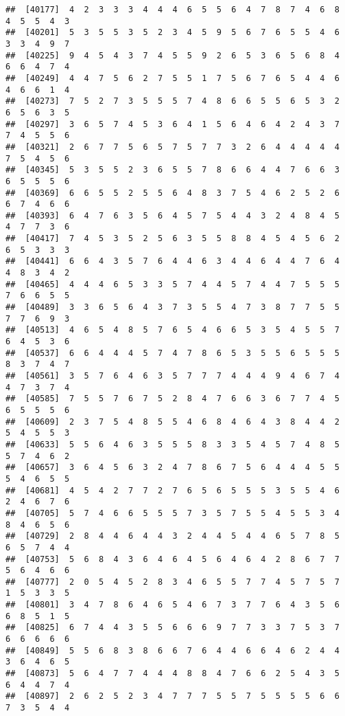 \documentclass[
]{book}
\begin{document}
\begin{verbatim}
##  [40177]  4  2  3  3  3  4  4  4  6  5  5  6  4  7  8  7  4  6  8  4  5  5  4  3
##  [40201]  5  3  5  5  3  5  2  3  4  5  9  5  6  7  6  5  5  4  6  3  3  4  9  7
##  [40225]  9  4  5  4  3  7  4  5  5  9  2  6  5  3  6  5  6  8  4  6  6  4  7  4
##  [40249]  4  4  7  5  6  2  7  5  5  1  7  5  6  7  6  5  4  4  6  4  6  6  1  4
##  [40273]  7  5  2  7  3  5  5  5  7  4  8  6  6  5  5  6  5  3  2  6  5  6  3  5
##  [40297]  3  6  5  7  4  5  3  6  4  1  5  6  4  6  4  2  4  3  7  7  4  5  5  6
##  [40321]  2  6  7  7  5  6  5  7  5  7  7  3  2  6  4  4  4  4  4  7  5  4  5  6
##  [40345]  5  3  5  5  2  3  6  5  5  7  8  6  6  4  4  7  6  6  3  6  5  5  5  6
##  [40369]  6  6  5  5  2  5  5  6  4  8  3  7  5  4  6  2  5  2  6  6  7  4  6  6
##  [40393]  6  4  7  6  3  5  6  4  5  7  5  4  4  3  2  4  8  4  5  4  7  7  3  6
##  [40417]  7  4  5  3  5  2  5  6  3  5  5  8  8  4  5  4  5  6  2  6  5  3  3  3
##  [40441]  6  6  4  3  5  7  6  4  4  6  3  4  4  6  4  4  7  6  4  4  8  3  4  2
##  [40465]  4  4  4  6  5  3  3  5  7  4  4  5  7  4  4  7  5  5  5  7  6  6  5  5
##  [40489]  3  3  6  5  6  4  3  7  3  5  5  4  7  3  8  7  7  5  5  7  7  6  9  3
##  [40513]  4  6  5  4  8  5  7  6  5  4  6  6  5  3  5  4  5  5  7  6  4  5  3  6
##  [40537]  6  6  4  4  4  5  7  4  7  8  6  5  3  5  5  6  5  5  5  8  3  7  4  7
##  [40561]  3  5  7  6  4  6  3  5  7  7  7  4  4  4  9  4  6  7  4  4  7  3  7  4
##  [40585]  7  5  5  7  6  7  5  2  8  4  7  6  6  3  6  7  7  4  5  6  5  5  5  6
##  [40609]  2  3  7  5  4  8  5  5  4  6  8  4  6  4  3  8  4  4  2  5  4  5  5  3
##  [40633]  5  5  6  4  6  3  5  5  5  8  3  3  5  4  5  7  4  8  5  5  7  4  6  2
##  [40657]  3  6  4  5  6  3  2  4  7  8  6  7  5  6  4  4  4  5  5  5  4  6  5  5
##  [40681]  4  5  4  2  7  7  2  7  6  5  6  5  5  5  3  5  5  4  6  2  4  6  7  6
##  [40705]  5  7  4  6  6  5  5  5  7  3  5  7  5  5  4  5  5  3  4  8  4  6  5  6
##  [40729]  2  8  4  4  6  4  4  3  2  4  4  5  4  4  6  5  7  8  5  6  5  7  4  4
##  [40753]  5  6  8  4  3  6  4  6  4  5  6  4  6  4  2  8  6  7  7  5  6  4  6  6
##  [40777]  2  0  5  4  5  2  8  3  4  6  5  5  7  7  4  5  7  5  7  1  5  3  3  5
##  [40801]  3  4  7  8  6  4  6  5  4  6  7  3  7  7  6  4  3  5  6  6  8  5  1  5
##  [40825]  6  7  4  4  3  5  5  6  6  6  9  7  7  3  3  7  5  3  7  6  6  6  6  6
##  [40849]  5  5  6  8  3  8  6  6  7  6  4  4  6  6  4  6  2  4  4  3  6  4  6  5
##  [40873]  5  6  4  7  7  4  4  4  8  8  4  7  6  6  2  5  4  3  5  6  4  4  7  4
##  [40897]  2  6  2  5  2  3  4  7  7  7  5  5  7  5  5  5  5  6  6  7  3  5  4  4

\end{verbatim}
\end{document}
